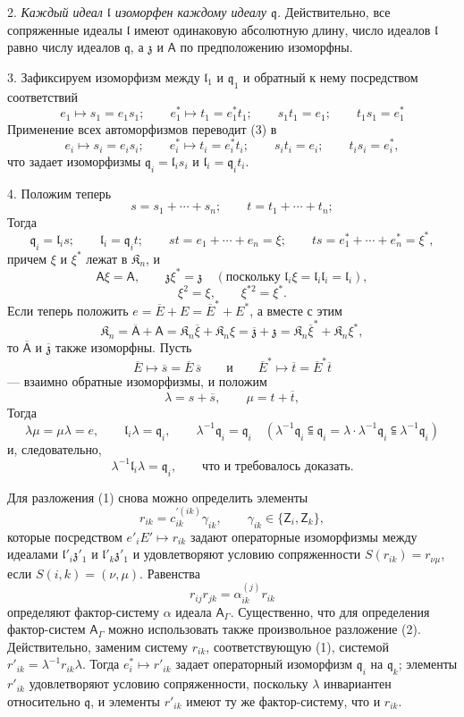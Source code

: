 \documentclass[11pt]{article}
\begin{document}
2. \emph{Каждый идеал \(\mathfrak l\) изоморфен каждому идеалу \(\mathfrak q\).} Действительно, все сопряженные идеалы \(\mathfrak l\) имеют одинаковую абсолютную длину, число идеалов \(\mathfrak l\) равно числу идеалов \(\mathfrak q\), а \(\mathfrak z\) и \(\mathsf{A}\) по предположению изоморфны.

3. Зафиксируем изоморфизм между \(\mathfrak l_1\) и \(\mathfrak q_1\) и обратный к нему посредством соответствий
\[
\tag{3}
e_1\mapsto s_1=e_1s_1;\qquad
e_1^*\mapsto t_1=e_1^*t_1;\qquad
s_1t_1=e_1;\qquad
t_1s_1=e_1^*
\]
Применение всех автоморфизмов переводит (3) в
\[
e_i\mapsto s_i=e_is_i;\qquad
e_i^*\mapsto t_i=e_i^*t_i;\qquad
s_it_i=e_i;\qquad
t_is_i=e_i^*,
\]
что задает изоморфизмы \(\mathfrak q_i=\mathfrak l_is_i\) и \(\mathfrak l_i=\mathfrak q_it_i\).

4. Положим теперь
\[
s=s_1+\cdots+s_n;\qquad t=t_1+\cdots+t_n;
\]
Тогда
\[
\mathfrak q_i=\mathfrak l_is;\qquad
\mathfrak l_i=\mathfrak q_it;\qquad
st=e_1+\cdots+e_n=\xi;\qquad
ts=e_1^*+\cdots+e_n^*=\xi^*,
\]
причем \(\xi\) и \(\xi^*\) лежат в \(\mathfrak K_n\), и
\[
\mathsf{A}\xi=\mathsf{A},\qquad \mathfrak z\xi^*=\mathfrak z\quad
(\text{поскольку }\mathfrak l_i\xi=\mathfrak l_i\mathfrak l_i=\mathfrak l_i),
\]
\[
\xi^2=\xi,\qquad \xi^{*2}=\xi^*.
\]
Если теперь положить \(e=\overline E+E=\overline E^*+E^*\), а вместе с этим
\[
\mathfrak K_n=\overline{\mathsf A}+\mathsf{A}
=\mathfrak K_n\overline\xi+\mathfrak K_n\xi
=\overline{\mathfrak z}+\mathfrak z
=\mathfrak K_n\overline\xi^*+\mathfrak K_n\xi^*,
\]
то \(\overline{\mathsf A}\) и \(\overline{\mathfrak z}\) также изоморфны. Пусть
\[
\overline E\mapsto\overline s=\overline E\,\overline s
\qquad\text{и}\qquad
\overline E^*\mapsto\overline t=\overline E^*\overline t
\]
--- взаимно обратные изоморфизмы, и положим
\[
\lambda=s+\overline s,\qquad \mu=t+\overline t,
\]
Тогда
\[
\lambda\mu=\mu\lambda=e,\qquad
\mathfrak l_i\lambda=\mathfrak q_i,\qquad
\lambda^{-1}\mathfrak q_i=\mathfrak q_i
\quad
(\lambda^{-1}\mathfrak q_i\subseteqq\mathfrak q_i
=\lambda\cdot\lambda^{-1}\mathfrak q_i\subseteqq\lambda^{-1}\mathfrak q_i)
\]
и, следовательно,
\[
\lambda^{-1}\mathfrak l_i\lambda=\mathfrak q_i,\qquad \text{что и требовалось доказать.}
\]

Для разложения (1) снова можно определить элементы
\[
r_{ik}=c_{ik}^{\prime(ik)}\gamma_{ik},\qquad \gamma_{ik}\in\{\mathsf{Z}_i,\mathsf{Z}_k\},
\]
которые посредством \(e'_iE'\mapsto r_{ik}\) задают операторные изоморфизмы между идеалами \(\mathfrak l'_i\mathfrak z'_1\) и \(\mathfrak l'_k\mathfrak z'_1\) и удовлетворяют условию сопряженности \(S(r_{ik})=r_{\nu\mu}\), если \(S(i,k)=(\nu,\mu)\). Равенства
\[
r_{ij}r_{jk}=\alpha_{ik}^{(j)}r_{ik}
\]
определяют фактор-систему \(\alpha\) идеала \(\mathsf{A}_\Gamma\). Существенно, что для определения фактор-систем \(\mathsf{A}_\Gamma\) можно использовать также произвольное разложение (2). Действительно, заменим систему \(r_{ik}\), соответствующую (1), системой \(r'_{ik}=\lambda^{-1}r_{ik}\lambda\). Тогда \(e_i^*\mapsto r'_{ik}\) задает операторный изоморфизм \(\mathfrak q_i\) на \(\mathfrak q_k\); элементы \(r'_{ik}\) удовлетворяют условию сопряженности, поскольку \(\lambda\) инвариантен относительно \(\mathfrak q\), и элементы \(r'_{ik}\) имеют ту же фактор-систему, что и \(r_{ik}\).
\end{document}
